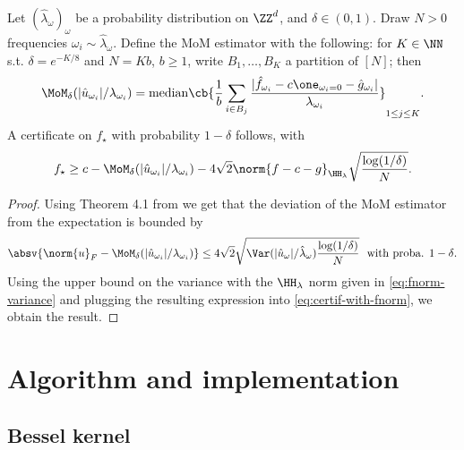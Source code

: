 \documentclass{article}
\begin{document}
\begin{theorem}\label{thm:certificate-mom}
  Let $(\hat{\lambda}_\omega)_{\omega}$ be a probability distribution on $\ZZ^d$, and $\delta \in (0,1)$. Draw $N > 0$ frequencies $\omega_i \sim \hat{\lambda}_\omega$. Define the MoM estimator with the following: for $K \in \NN$ s.t. $\delta = e^{-K/8}$ and $N = Kb$, $b \geq 1$, write $B_1, \dots, B_K$ a partition of $[N]$; then
  \begin{equation}
    \MoM_\delta(|\hat{u}_{\omega_i}| / \lambda_{\omega_i}) = \mathrm{median} \cb{\frac{1}{b} \sum_{i \in B_j} \frac{|\hat{f}_{\omega_i} - c \one_{\omega_i = 0} - \hat{g}_{\omega_i}|}{\lambda_{\omega_i}}}_{1 \leq j \leq K}.
  \end{equation}
  A certificate on $f_\star$ with probability $1-\delta$ follows, with
  \begin{equation}
    f_\star \geq c - \MoM_\delta(|\hat{u}_{\omega_i}| / \lambda_{\omega_i}) - 4\sqrt{2} \norm{f - c - g}_{\HH_\lambda} \sqrt{\frac{\log(1/\delta)}{N}}.
  \end{equation}
\end{theorem}
\begin{proof}
  Using \eg Theorem 4.1 from \cite{devroyeSubGaussianMeanEstimators2016} we get that the deviation of the MoM estimator from the expectation is bounded by
  \begin{equation}\label{eq:proof-mom-1}
    \absv{
      \norm{u}_F - \MoM_\delta(|\hat{u}_{\omega_i}| / \lambda_{\omega_i})
    } \leq 4\sqrt{2} \sqrt{\Var(|\hat{u}_\omega|/\hat{\lambda}_\omega) \frac{\log(1/\delta)}{N}}
    ~~ \text{with proba. $1 - \delta$.}
  \end{equation}
  Using the upper bound on the variance with the $\HH_\lambda$ norm given in \cref{eq:fnorm-variance} and plugging the resulting expression into \cref{eq:certif-with-fnorm}, we obtain the result.
\end{proof}

\section{Algorithm and implementation}
\label{sec:alg+impl}

\subsection{Bessel kernel}
\end{document}
